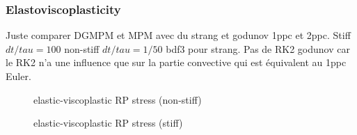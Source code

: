 \subsubsection{Elastoviscoplasticity}

Juste comparer DGMPM et MPM avec du strang et godunov 1ppc et 2ppc. Stiff $dt/tau=100$ non-stiff $dt/tau=1/50$ bdf3 pour strang. Pas de RK2 godunov car le RK2 n'a une influence que sur la partie convective qui est équivalent au 1ppc Euler.

\begin{figure}[h!]
  \centering
  {}
  \caption{elastic-viscoplastic RP stress (non-stiff)}
  \label{fig:stress_elastoviscoplastic_RP}
\end{figure}


\begin{figure}[h!]
  \centering
  {}
  \caption{elastic-viscoplastic RP stress (stiff)}
  \label{fig:stress_elastoviscoplastic_RP}
\end{figure}


